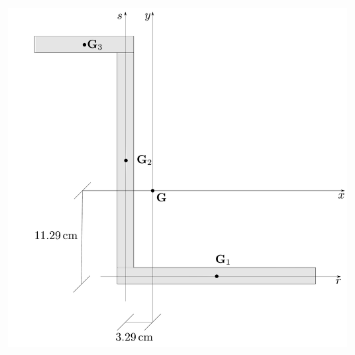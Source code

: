 \begin{figure}[ht]
\centering
\includegraphics[width=0.8\textwidth]{Immagini/Parte_4/Esercizio4_1/Esercizio4_1_2.pdf}
\caption{}
\label{Esercizio4-1-2}
\end{figure}

